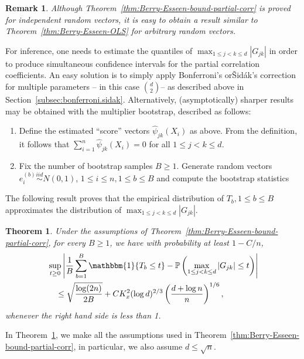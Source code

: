 \documentclass{article}
\newtheorem{theorem}{Theorem}
\newtheorem{remark}{Remark}
\begin{document}
\begin{remark}
Although Theorem~\ref{thm:Berry-Esseen-bound-partial-corr} is proved for independent random vectors, it is easy to obtain a result similar to Theorem~\ref{thm:Berry-Esseen-OLS} for arbitrary random vectors.
\end{remark}
For inference, one needs to estimate the quantiles of $\max_{1\le j < k\le d}|G_{jk}|$ in order to produce simultaneous confidence intervals for the partial correlation coefficients. An easy solution is to simply apply Bonferroni's or{\v{S}}id{\'a}k's correction for multiple parameters -- in this case ${d \choose 2} $--
as described above in Section~\ref{subsec:bonferroni.sidak}.
Alternatively, (asymptotically) sharper results may be obtained with the multiplier bootstrap, described as follows:
\begin{enumerate}
\item Define the estimated ``score'' vectors $\widehat{\psi}_{jk}(X_i)$ as above. From the definition, it follows that $\sum_{i=1}^n \widehat{\psi}_{jk}(X_i) = 0$ for all $1\le j < k\le d$.
\item Fix the number of bootstrap samples $B \ge 1$. Generate random vectors $e_i^{(b)}\overset{iid}{\sim}N(0, 1)$, $1\le i\le n, 1\le b\le B$ and compute the bootstrap statistics
\ \end{enumerate}
The following result proves that the empirical distribution of $T_b, 1\le b\le B$ approximates the distribution of $\max_{1\le j < k\le d}|G_{jk}|$.
\begin{theorem}\label{eq:multplier-bootstrap-consistency-partial-corr}
Under the assumptions of Theorem~\ref{thm:Berry-Esseen-bound-partial-corr}, for every $B\ge1$, we have with probability at least $1 - C/n$,
\begin{align*}
&\sup_{t\ge0}\left|\frac{1}{B}\sum_{b=1}^B \mathbbm{1}\{T_b \le t\} - \mathbb{P}\left(\max_{1\le j < k\le d}|G_{jk}| \le t\right)\right|\\ &\quad\le \sqrt{\frac{\log(2n)}{2B}} + CK_x^{2}(\log d)^{{2}/{3}}\left(\frac{d + \log n}{n}\right)^{{1}/{6}},
\end{align*}
whenever the right hand side is less than 1.
\end{theorem}
In Theorem~\ref{eq:multplier-bootstrap-consistency-partial-corr}, we make all the assumptions used in Theorem~\ref{thm:Berry-Esseen-bound-partial-corr}, in particular, we also assume $d \le \sqrt{n}$.
\end{document}
